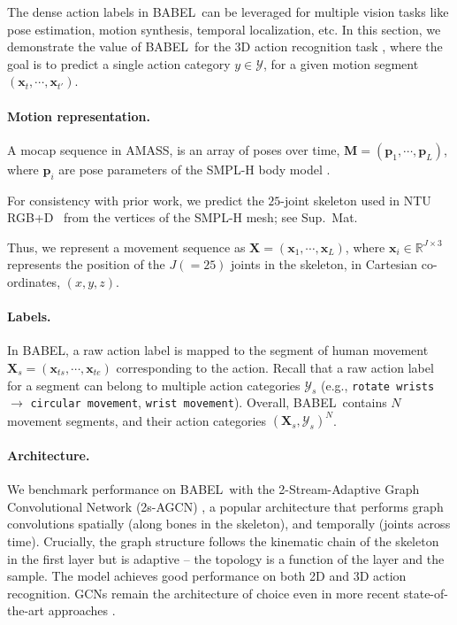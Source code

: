 \documentclass[final]{cvpr}
\def\babel{BABEL}
\def\ntu{NTU RGB+D}
\def\twoSAGCN{2s-AGCN}
\begin{document}
The dense action labels in \babel~can be leveraged for multiple vision tasks like pose estimation, motion synthesis, temporal localization, etc. In this section, we demonstrate the value of \babel~for the 3D action recognition task \cite{DBLP:journals/pami/LiuSPWDK20,DBLP:conf/cvpr/ShahroudyLNW16}, 
where the goal is to predict a single action category $y \in \mathcal{Y}$, for a given motion segment $(\mathbf{x}_t, \cdots, \mathbf{x}_{t'})$. 

\paragraph{Motion representation.} 
A mocap sequence in AMASS, is an array of poses over time, $\mathbf{M} = (\mathbf{p}_1, \cdots, \mathbf{p}_L)$, where $\mathbf{p}_i$ are  pose parameters of the SMPL-H body model \cite{MANO:SIGGRAPHASIA:2017}. 

For consistency with prior work, we predict the $25$-joint skeleton used in \ntu~\cite{DBLP:conf/cvpr/ShahroudyLNW16}
from the vertices of the SMPL-H mesh; see Sup.~Mat.

Thus, we represent a  movement sequence as $\mathbf{X} = (\mathbf{x}_1, \cdots, \mathbf{x}_L)$, where $\mathbf{x}_i \in \mathbb{R}^{J \times 3}$ represents the position of the $J(=25)$ joints in the skeleton, in Cartesian co-ordinates, $(x, y, z)$. 

\noindent
\paragraph{Labels.} 
In \babel, a raw action label is mapped to the segment of human movement $\mathbf{X}_s = (\mathbf{x}_{ts}, \cdots, \mathbf{x}_{te})$ corresponding to the action. 
Recall that a raw action label for a segment can belong to multiple action categories $\mathcal{Y}_s$ (e.g., \texttt{rotate wrists} $\rightarrow$ \texttt{circular movement}, \texttt{wrist movement}). 
Overall, \babel~contains $N$ movement segments, and their action categories $(\mathbf{X}_s, \mathcal{Y}_s)^N$. 


\noindent
\paragraph{Architecture.} 
We benchmark performance on \babel~with the 2-Stream-Adaptive Graph Convolutional Network (\twoSAGCN) \cite{shi2019two}, a popular architecture that performs graph convolutions spatially (along bones in the skeleton), and temporally (joints across time). 
Crucially, the graph structure follows the kinematic chain of the skeleton in the first layer but is adaptive -- the topology is a function of the layer and the sample. 
The model achieves good performance on both 2D and 3D action recognition. 
GCNs remain the architecture of choice even in more recent state-of-the-art approaches \cite{DBLP:conf/cvpr/Cheng0HC0L20}. 
\end{document}
